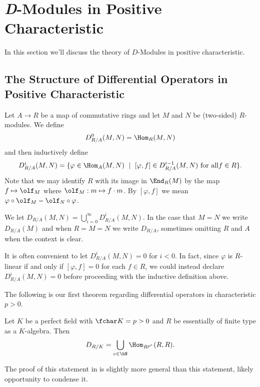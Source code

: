 \section{\emph{D}-Modules in Positive Characteristic}
In this section we'll discuss the theory of $D$-Modules in positive characteristic. 
\subsection{The Structure of Differential Operators in Positive Characteristic}

\begin{defn}\label{defn:diff-op-rings}
	Let $A\to R$ be a map of commutative rings and let $M$ and $N$ be (two-sided) $R$-modules. We define
	\begin{align*}
		D^0_{R/A}(M,N) = \Hom_R(M,N)
	\end{align*}
	and then inductively define
	\begin{align*}
		D^i_{R/A}(M,N) = \{\varphi \in \Hom_A(M,N) ~\mid~ [\varphi,f] \in D^{i-1}_{R/A}(M,N) ~ \text{for all} f \in R\}.
	\end{align*}
    Note that we may identify $R$ with its image in $\End_R(M)$ by the map $f \mapsto \olf_M$ where $\olf_M: m\mapsto f\cdot m$. By $[\varphi,f]$ we mean $\varphi\circ \olf_M - \olf_N\circ \varphi$.

	We let $D_{R/A}(M,N) = \bigcup_{i=0}^\infty D^{i}_{R/A}(M,N)$. In the case that $M = N$ we write $D_{R/A}(M)$ and when $R = M = N$ we write $D_{R/A}$, sometimes omitting $R$ and $A$ when the context is clear.
\end{defn}
It is often convenient to let $D^i_{R/A}(M,N) = 0$ for $i < 0$. In fact, since $\varphi$ is $R$-linear if and only if $[\varphi, f] = 0$ for each $f \in R$, we could instead declare $D^i_{R/A}(M,N) = 0$ before proceeding with the inductive definition above.

The following is our first theorem regarding differential operators in characteristic $p > 0$.

\begin{thm}\label{thm:perfect-field-diff-op}
	Let $K$ be a perfect field with $\fchar K = p > 0$ and $R$ be essentially of finite type as a $K$-algebra. Then
	\begin{align*}
		D_{R/K} = \bigcup_{e\in \bN} \Hom_{R^{p^e}}(R,R).
	\end{align*}
\end{thm}
\begin{prf}
	The proof of this statement in \cite{amon92} is slightly more general than this statement, likely opportunity to condense it.
\end{prf}

